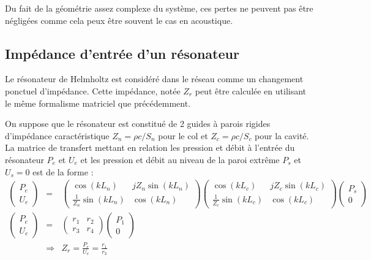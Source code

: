 Du fait de la géométrie assez complexe du système, ces pertes ne peuvent pas être négligées comme cela peux être souvent le cas en acoustique.

\subsection{Impédance d'entrée d'un résonateur}
Le résonateur de Helmholtz est considéré dans le réseau comme un changement ponctuel d'impédance. Cette impédance, notée $Z_{r}$ peut être calculée en utilisant le même formalisme matriciel que précédemment.




On suppose que le résonateur est constitué de 2 guides à parois rigides d'impédance caractéristique $Z_{n}=\rho c/S_{n}$ pour le col et $Z_{c}=\rho c /S_{c}$ pour la cavité. La matrice de transfert mettant en relation les pression et débit à l'entrée du résonateur $P_e$ et $U_e$ et les pression et débit au niveau de la paroi extrême $P_s$ et $U_s=0$ est de la forme :
\begin{eqnarray*}
\begin{pmatrix} P_e \\U_e \end{pmatrix} & = & \begin{pmatrix} \cos(k L_n) & j Z_{n} \sin(k L_n) \\ \frac{1}{Z_{n}} \sin(k L_n) & \cos(k L_n) \end{pmatrix} \begin{pmatrix} \cos(k L_c) & j Z_{c} \sin(k L_c) \\ \frac{1}{Z_{c}} \sin(k L_c) & \cos(k L_c) \end{pmatrix} \begin{pmatrix} P_s \\ 0  \end{pmatrix} \\
\begin{pmatrix} P_e \\U_e \end{pmatrix} & = & \begin{pmatrix} r_1 & r_2 \\ r_3 & r_4 \end{pmatrix} \begin{pmatrix} P_1 \\ 0  \end{pmatrix} \\
~ & \Rightarrow & Z_{r}	 = \frac{P_e}{U_e}= \frac{r_1}{r_3}
\end{eqnarray*}

